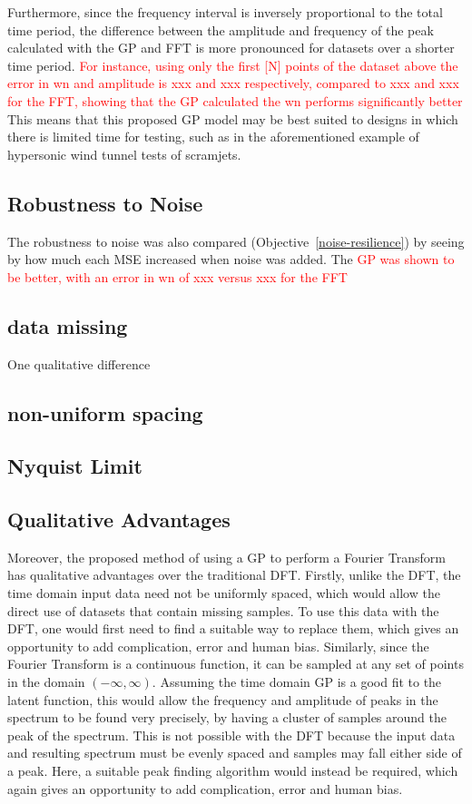 \documentclass[12pt]{article}
\begin{document}
    Furthermore, since the frequency interval is inversely proportional to the total time period, the difference between the amplitude and frequency of the peak calculated with the GP and FFT is more pronounced for datasets over a shorter time period.
    \textcolor{red}{For instance, using only the first [N] points of the dataset above the error in wn and amplitude is xxx and xxx respectively, compared to xxx and xxx for the FFT, showing that the GP calculated the wn performs significantly better}
    This means that this proposed GP model may be best suited to designs in which there is limited time for testing, such as in the aforementioned example of hypersonic wind tunnel tests of scramjets.

    \subsection{Robustness to Noise}
    The robustness to noise was also compared (Objective~\ref{noise-resilience}) by seeing by how much each MSE increased when noise was added.
    The \textcolor{red}{GP was shown to be better, with an error in wn of xxx versus xxx for the FFT}

    \subsection{data missing}
    One qualitative difference


    \subsection{non-uniform spacing}
    \subsection{Nyquist Limit}

    \subsection{Qualitative Advantages}
    Moreover, the proposed method of using a GP to perform a Fourier Transform has qualitative advantages over the traditional DFT.
    Firstly, unlike the DFT, the time domain input data need not be uniformly spaced, which would allow the direct use of datasets that contain missing samples.
    To use this data with the DFT, one would first need to find a suitable way to replace them, which gives an opportunity to add complication, error and human bias.
    Similarly, since the Fourier Transform is a continuous function, it can be sampled at any set of points in the domain $(-\infty, \infty)$.
    Assuming the time domain GP is a good fit to the latent function, this would allow the frequency and amplitude of peaks in the spectrum to be found very precisely, by having a cluster of samples around the peak of the spectrum.
    This is not possible with the DFT because the input data and resulting spectrum must be evenly spaced and samples may fall either side of a peak.
    Here, a suitable peak finding algorithm would instead be required, which again gives an opportunity to add complication, error and human bias.
\end{document}
